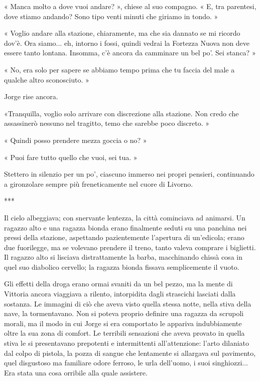 « Manca molto a dove vuoi andare? », chiese al suo compagno. « E, tra parentesi, dove stiamo andando? Sono tipo venti minuti che giriamo in tondo. »

« Voglio andare alla stazione, chiaramente, ma che sia dannato se mi ricordo dov'è. Ora siamo... eh, intorno i fossi, quindi vedrai la Fortezza Nuova non deve essere tanto lontana. Insomma, c'è ancora da camminare un bel po'. Sei stanca? »

« No, era solo per sapere se abbiamo tempo prima che tu faccia del male a qualche altro sconosciuto. »

Jorge rise ancora.

«Tranquilla, voglio solo arrivare con discrezione alla stazione. Non credo che assassinerò nessuno nel tragitto, temo che sarebbe poco discreto. »

« Quindi posso prendere mezza goccia o no? »

« Puoi fare tutto quello che vuoi, sei tua. »

Stettero in silenzio per un po', ciascuno immerso nei propri pensieri, continuando a gironzolare sempre più freneticamente nel cuore di Livorno.

***

Il cielo albeggiava; con snervante lentezza, la città cominciava ad animarsi. Un ragazzo alto e una ragazza bionda erano finalmente seduti su una panchina nei pressi della stazione, aspettando pazientemente l'apertura di un'edicola; erano due fuorilegge, ma se volevano prendere il treno, tanto valeva comprare i biglietti.  Il ragazzo alto si lisciava distrattamente la barba, macchinando chissà cosa in quel suo diabolico cervello; la ragazza bionda fissava semplicemente il vuoto.

Gli effetti della droga erano ormai svaniti da un bel pezzo, ma la mente di Vittoria ancora viaggiava a rilento, intorpidita dagli strascichi lasciati dalla sostanza. Le immagini di ciò che aveva visto quella stessa notte, nella stiva della nave, la tormentavano. Non si poteva proprio definire una ragazza da scrupoli morali, ma il modo in cui Jorge si era comportato le appariva indubbiamente oltre la sua zona di comfort. Le terribili sensazioni che aveva provato in quella stiva le si presentavano prepotenti e intermittenti all'attenzione: l'arto dilaniato dal colpo di pistola, la pozza di sangue che lentamente si allargava sul pavimento, quel disgustoso ma familiare odore ferroso, le urla dell'uomo, i suoi singhiozzi... Era stata una cosa orribile alla quale assistere.

